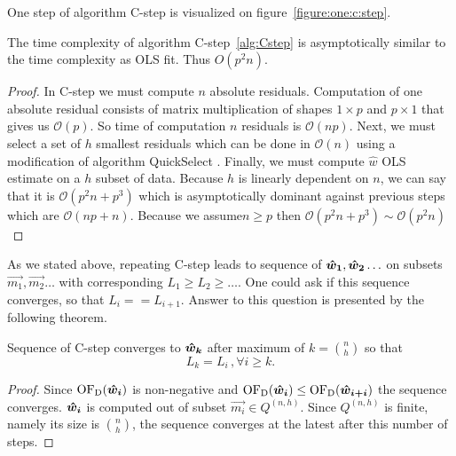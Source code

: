 One step of algorithm C-step is visualized on figure~\ref{figure:one:c:step}.



\begin{observation} 
    The time complexity of algorithm C-step~\ref{alg:Cstep} is asymptotically similar to the time complexity as OLS fit. Thus $O(p^2n)$.
\end{observation} 

\begin{proof}
    In C-step we must compute $n$ absolute residuals. Computation of one absolute residual consists of
    matrix multiplication of shapes $1 \times p$ and $p \times 1$ that gives us $\mathcal{O}(p)$. So time of computation $n$ residuals is $\mathcal{O}(np)$.
    Next, we must select a set of $h$ smallest residuals which can be done in $\mathcal{O}(n)$ using a modification of algorithm QuickSelect \cite{hoare1961algorithm}.
    Finally, we must compute $\hat{w}$ OLS estimate on a $h$ subset of data. Because $h$ is linearly dependent on $n$, we can say that it is $\mathcal{O}(p^2n + p^3)$ which is asymptotically dominant against previous steps which are $\mathcal{O}(np + n)$. Because we assume$n \ge p$ then $\mathcal{O}(p^2n + p^3) \sim \mathcal{O}(p^2n) $
\end{proof}

As we stated above, repeating C-step leads to sequence of $\boldsymbol{\hat{w}_1}, \boldsymbol{\hat{w}_2} \ldots$ 
on subsets $\vec{m_1}, \vec{m_2} \ldots$ with corresponding 
$L_1 \geq L_2\geq \ldots$. One could ask if this sequence converges, so that $L_i == L_{i+1}$. 
Answer to this question is presented by the following theorem.




\begin{theorem}
    Sequence of C-step converges to $\boldsymbol{\hat{w}_{k}}$ after maximum of $k = {n \choose h}$ so that
\begin{equation}
    L_k = L_i \,, \forall i \geq k.
\end{equation}
\end{theorem}

\begin{proof}
    Since  $\operatorname{OF_D}(\boldsymbol{\hat{w}_{i}})$ is non-negative and $\operatorname{OF_D}(\boldsymbol{\hat{w}_{i}}) \leq \operatorname{OF_D}(\boldsymbol{\hat{w}_{i+i}})$ the sequence  converges. $\boldsymbol{\hat{w}_{i}}$  is computed out of subset 
    $\vec{m_i} \in Q^{(n, h)}$. Since $Q^{(n, h)}$ is finite,  namely its size is ${n \choose h}$, the sequence converges at the latest after this number of steps.
\end{proof}



